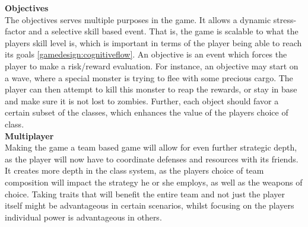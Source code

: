 \textbf{Objectives}\label{gamedesign:ourgame:objectives}\\
The objectives serves multiple purposes in the game. It allows a dynamic stress-factor and a selective skill based event. 
That is, the game is scalable to what the players skill level is, which is important in terms of the player being able to reach its goals \ref{gamedesign:cognitiveflow}. 
An objective is an event which forces the player to make a risk/reward evaluation. 
For instance, an objective may start on a wave, where a special monster is trying to flee with some precious cargo. 
The player can then attempt to kill this monster to reap the rewards, or stay in base and make sure it is not lost to zombies.
Further, each object should favor a certain subset of the classes, which enhances the value of the players choice of class.\\

\textbf{Multiplayer}\label{gamedesign:ourgame:multiplayer}\\
Making the game a team based game will allow for even further strategic depth, as the player will now have to coordinate defenses and resources with its friends.
It creates more depth in the class system, as the players choice of team composition will impact the strategy he or she employs, as well as the weapons of choice.
Taking traits that will benefit the entire team and not just the player itself might be advantageous in certain scenarios, whilst focusing on the players individual power is advantageous in others.